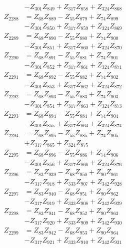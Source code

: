 \begin{multicols}{2}
\begin{align}
&- Z_{301}Z_{849} + Z_{317}Z_{858} + Z_{324}Z_{868} \nonumber \\
Z_{2288} &= Z_{68}Z_{889} - Z_{55}Z_{879} + Z_{74}Z_{899}  \nonumber \\
&- Z_{301}Z_{850} + Z_{317}Z_{859} + Z_{324}Z_{869} \nonumber \\
Z_{2289} &= Z_{68}Z_{890} - Z_{55}Z_{880} + Z_{74}Z_{900}  \nonumber \\
&- Z_{301}Z_{851} + Z_{317}Z_{860} + Z_{324}Z_{870} \nonumber \\
Z_{2290} &= Z_{68}Z_{891} - Z_{55}Z_{881} + Z_{74}Z_{901}  \nonumber \\
&- Z_{301}Z_{852} + Z_{317}Z_{861} + Z_{324}Z_{871} \nonumber \\
Z_{2291} &= Z_{68}Z_{892} - Z_{55}Z_{882} + Z_{74}Z_{902}  \nonumber \\
&- Z_{301}Z_{853} + Z_{317}Z_{862} + Z_{324}Z_{872} \nonumber \\
Z_{2292} &= Z_{68}Z_{893} - Z_{55}Z_{883} + Z_{74}Z_{903}  \nonumber \\
&- Z_{301}Z_{854} + Z_{317}Z_{863} + Z_{324}Z_{873} \nonumber \\
Z_{2293} &= Z_{68}Z_{894} - Z_{55}Z_{884} + Z_{74}Z_{904}  \nonumber \\
&- Z_{301}Z_{855} + Z_{317}Z_{864} + Z_{324}Z_{874} \nonumber \\
Z_{2294} &= Z_{68}Z_{895} - Z_{55}Z_{885} + Z_{74}Z_{905}  \nonumber \\
&+ Z_{317}Z_{865} + Z_{324}Z_{875} \nonumber \\
Z_{2295} &= Z_{68}Z_{896} - Z_{55}Z_{886} + Z_{74}Z_{906}  \nonumber \\
&- Z_{301}Z_{856} + Z_{317}Z_{866} + Z_{324}Z_{876} \nonumber \\
Z_{2296} &= Z_{83}Z_{939} - Z_{68}Z_{950} + Z_{90}Z_{961}  \nonumber \\
&- Z_{317}Z_{918} + Z_{333}Z_{907} + Z_{342}Z_{928} \nonumber \\
Z_{2297} &= Z_{83}Z_{940} - Z_{68}Z_{951} + Z_{90}Z_{962}  \nonumber \\
&- Z_{317}Z_{919} + Z_{333}Z_{908} + Z_{342}Z_{929} \nonumber \\
Z_{2298} &= Z_{83}Z_{941} - Z_{68}Z_{952} + Z_{90}Z_{963}  \nonumber \\
&- Z_{317}Z_{920} + Z_{333}Z_{909} + Z_{342}Z_{930} \nonumber \\
Z_{2299} &= Z_{83}Z_{942} - Z_{68}Z_{953} + Z_{90}Z_{964}  \nonumber \\
&- Z_{317}Z_{921} + Z_{333}Z_{910} + Z_{342}Z_{931} \nonumber \\

\end{align}
\end{multicols}
